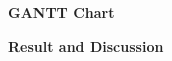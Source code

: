 \documentclass[12pt]{article}
\begin{document}

\par

{\fontsize{20pt}{24.0pt}\selectfont \textbf{\textcolor[HTML]{222222}{GANTT Chart}}\par}\par


\vspace{\baselineskip}

\vspace{\baselineskip}

\vspace{\baselineskip}

\vspace{\baselineskip}

\vspace{\baselineskip}

\vspace{\baselineskip}

\vspace{\baselineskip}

\vspace{\baselineskip}

\vspace{\baselineskip}

\vspace{\baselineskip}

\vspace{\baselineskip}

\vspace{\baselineskip}

\vspace{\baselineskip}

\vspace{\baselineskip}
{\fontsize{20pt}{24.0pt}\selectfont \textbf{\textcolor[HTML]{222222}{Result and Discussion}}\par}\par


\vspace{\baselineskip}

\vspace{\baselineskip}

\printbibliography
\end{document}
